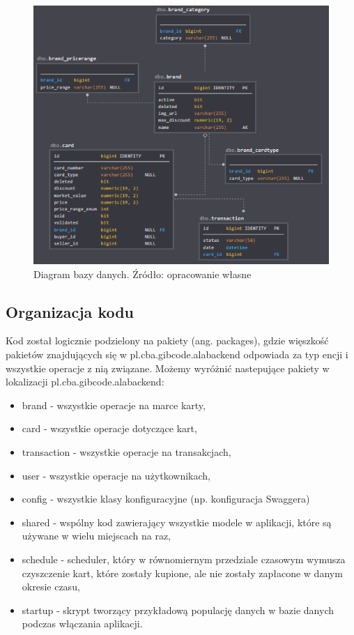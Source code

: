 \begin{figure}[h!]
  \centering
    \includegraphics[width=1.0\textwidth]{images/modelERP.PNG}
  \caption{Diagram bazy danych. Źródło: opracowanie własne }
\end{figure}
\FloatBarrier


\subsection{Organizacja kodu}
Kod został logicznie podzielony na pakiety (ang. packages), gdzie więszkość pakietów znajdujących się w pl.cba.gibcode.alabackend odpowiada za typ encji i wszystkie operacje z nią związane.
Możemy wyróżnić nastepujące pakiety w lokalizacji pl.cba.gibcode.alabackend:
\begin{itemize}
    \item brand - wszystkie operacje na marce karty,
    \item card - wszystkie operacje dotyczące kart,
    \item transaction - wszystkie operacje na transakcjach,
    \item user - wszystkie operacje na użytkownikach,
    \item config - wszystkie klasy konfiguracyjne (np. konfiguracja Swaggera)
    \item shared - wspólny kod zawierający wszystkie modele w aplikacji, które są używane w wielu miejscach na raz,
    \item schedule - scheduler, który w równomiernym przedziale czasowym wymusza czyszczenie kart, które zostały kupione, ale nie zostały zapłacone w danym okresie czasu,
    \item startup - skrypt tworzący przykładową populację danych w bazie danych podczas włączania aplikacji.
\end{itemize}


